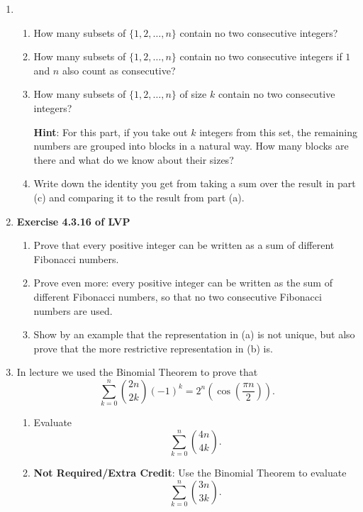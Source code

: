\documentclass[11pt]{article}
\begin{document}
\begin{enumerate}

\item 
\begin{enumerate}
\item How many subsets of $\{1,2,\ldots, n\}$ contain no two consecutive integers?

\item How many subsets of $\{1,2,\ldots, n\}$ contain no two consecutive integers if $1$ and $n$ also count as consecutive?

\item How many subsets of $\{1,2,\ldots, n\}$ of size $k$ contain no two consecutive integers?

{\bf Hint}: For this part, if you take out $k$ integers from this set, the remaining numbers are grouped into blocks in a natural way.  How many blocks are there and what do we know about their sizes?

\item Write down the identity you get from taking a sum over the result in part (c) and comparing it to the result from part (a).

\end{enumerate}

\item {\bf Exercise 4.3.16 of LVP} 
\begin{enumerate}
\item Prove that every positive integer can be written as a sum of different Fibonacci numbers.

\item Prove even more: every positive integer can be written as the sum of different Fibonacci numbers, so that no two consecutive Fibonacci numbers are used.

\item Show by an example that the representation in (a) is not unique, but also prove that the more restrictive representation in (b) is.
\end{enumerate}

\item In lecture we used the Binomial Theorem to prove that 
\[
\sum_{k=0}^n \binom{2n}{2k} (-1)^k = 2^n \left(\cos\left(\frac{\pi n}{2}\right)\right).
\]

\begin{enumerate}

\item Evaluate
\[ 
\sum_{k=0}^n \binom{4n}{4k}.
\]

\item {\bf Not Required/Extra Credit}: Use the Binomial Theorem to evaluate 
\[ 
\sum_{k=0}^n \binom{3n}{3k}.
\]


\end{enumerate}
\end{enumerate}
\end{document}
